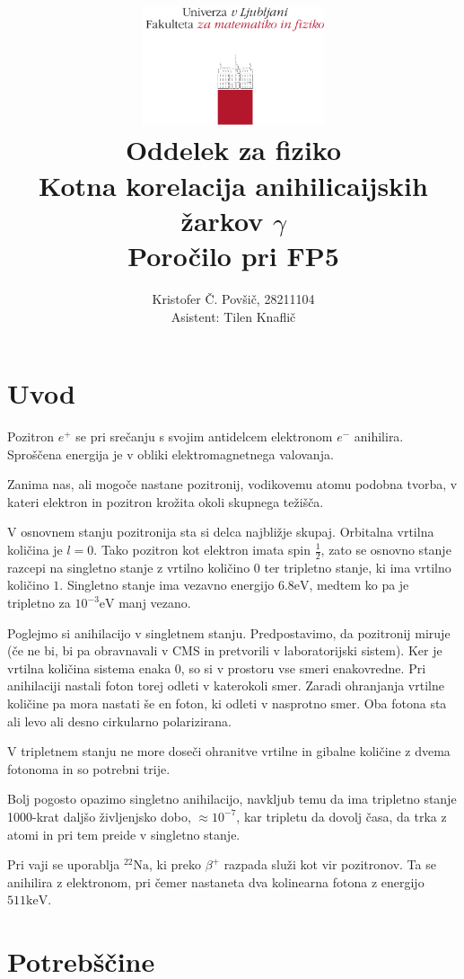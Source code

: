 \documentclass[11pt]{article}
\title{
  \includegraphics[width=0.4\textwidth]{fmf_logo}\\
  {\small Oddelek za fiziko} \\
  {Kotna korelacija anihilicaijskih žarkov $\gamma$}\\
  {\small Poročilo pri FP5}\\
}
\date{}
\author{ Kristofer Č. Povšič, 28211104 \\[5 cm]
 \small  Asistent: Tilen Knaflič \\
}
\begin{document}
\maketitle
\newpage
\tableofcontents

\section{Uvod}\label{sec:org254d4af}

Pozitron \(e^+\) se pri srečanju s svojim antidelcem elektronom \(e^-\) anihilira. Sproščena energija je v obliki elektromagnetnega valovanja.

Zanima nas, ali mogoče nastane pozitronij, vodikovemu atomu podobna tvorba, v kateri elektron in pozitron krožita okoli skupnega težišča.

V osnovnem stanju pozitronija sta si delca najbližje skupaj. Orbitalna vrtilna količina je \(l = 0\). Tako pozitron kot elektron imata spin \(\frac{1}{2}\), zato se osnovno stanje razcepi na singletno stanje z vrtilno količino \(0\) ter tripletno stanje, ki ima vrtilno količino \(1\). Singletno stanje ima vezavno energijo \(6.8 \mathrm{eV}\), medtem ko pa je tripletno za  \(10^{-3} \mathrm{eV}\) manj vezano.

Poglejmo si anihilacijo v singletnem stanju. Predpostavimo, da pozitronij miruje (če ne bi, bi pa obravnavali v CMS in pretvorili v laboratorijski sistem). Ker je vrtilna količina sistema enaka 0, so si v prostoru vse smeri enakovredne. Pri anihilaciji nastali foton torej odleti v katerokoli smer. Zaradi ohranjanja vrtilne količine pa mora nastati še en foton, ki odleti v nasprotno smer. Oba fotona sta ali levo ali desno cirkularno polarizirana.

V tripletnem stanju ne more doseči ohranitve vrtilne in gibalne količine z dvema fotonoma in so potrebni trije.

Bolj pogosto opazimo singletno anihilacijo, navkljub temu da ima tripletno stanje 1000-krat daljšo življenjsko dobo, \(\approx 10^{-7}\), kar tripletu da dovolj časa, da trka z atomi in pri tem preide v singletno stanje.

Pri vaji se uporablja \(^{22} \mathrm{Na}\), ki preko \(\beta^+\) razpada služi kot vir pozitronov. Ta se anihilira z elektronom, pri čemer nastaneta dva kolinearna fotona z energijo \(511 \mathrm{keV}\).
\section{Potrebščine}\label{sec:org9bc5234}
\end{document}
